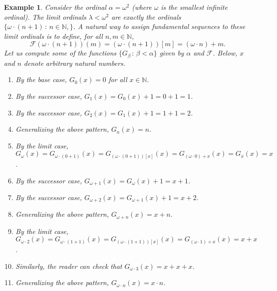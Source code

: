 \documentclass{article}
\newtheorem{example}[theorem]{Example}
\begin{document}
\begin{example}
    Consider the ordinal $\alpha=\omega^2$ (where $\omega$ is the smallest infinite
    ordinal).
    The limit ordinals $\lambda<\omega^2$ are exactly the ordinals
    $\{\omega\cdot (n+1)\,:\,n\in\mathbb N,\}$.
    A natural way to assign fundamental sequences to these limit ordinals is to define,
    for all $n,m\in\mathbb N$,
    \[
        \mathcal F(\omega\cdot(n+1))(m) = (\omega\cdot(n+1))[m] = (\omega\cdot n)+m.
    \]
    Let us compute some of the functions $\{G_{\beta}\,:\,\beta<\alpha\}$
    given by $\alpha$ and $\mathcal F$. Below, $x$ and $n$
    denote arbitrary natural numbers.
    \begin{enumerate}
        \item
        By the base case, $G_0(x)=0$ for all $x\in\mathbb N$.
        \item
        By the successor case, $G_1(x)=G_0(x)+1=0+1=1$.
        \item
        By the successor case, $G_2(x)=G_1(x)+1=1+1=2$.
        \item
        Generalizing the above pattern, $G_n(x)=n$.
        \item
        By the limit case,
        $G_\omega(x)=G_{\omega\cdot(0+1)}(x)
        =G_{(\omega\cdot(0+1))[x]}(x)=G_{(\omega\cdot 0)+x}(x)
        =G_x(x)=x$.
        \item
        By the successor case, $G_{\omega+1}(x)=G_{\omega}(x)+1=x+1$.
        \item
        By the successor case, $G_{\omega+2}(x)=G_{\omega+1}(x)+1=x+2$.
        \item
        Generalizing the above pattern, $G_{\omega+n}(x)=x+n$.
        \item
        By the limit case,
        $G_{\omega\cdot 2}(x)=G_{\omega\cdot(1+1)}(x)
        =G_{(\omega\cdot(1+1))[x]}(x)=G_{(\omega\cdot 1)+x}(x)
        =x+x$.
        \item
        Similarly, the reader can check that $G_{\omega\cdot 3}(x)=x+x+x$.
        \item
        Generalizing the above pattern, $G_{\omega\cdot n}(x)=x\cdot n$.
    \end{enumerate}
\end{example}
\end{document}
